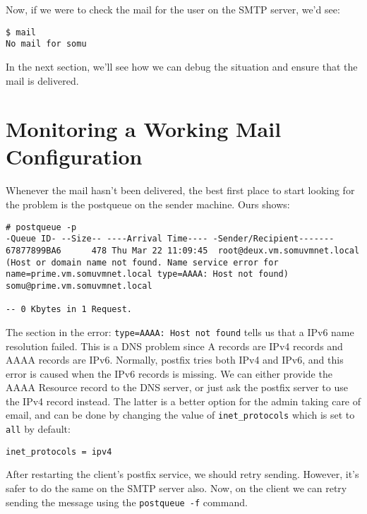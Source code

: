 \noindent
Now, if we were to check the mail for the user on the SMTP server, we'd see:

\vspace{-15pt}
\begin{verbatim}
$ mail
No mail for somu
\end{verbatim}
\vspace{-10pt}	

In the next section, we'll see how we can debug the situation and ensure that the mail is delivered. 

	\section{Monitoring a Working Mail Configuration}
Whenever the mail hasn't been delivered, the best first place to start looking for the problem is the postqueue on the sender machine. Ours shows:

\vspace{-15pt}
\begin{verbatim}
# postqueue -p
-Queue ID- --Size-- ----Arrival Time---- -Sender/Recipient-------
67877899BA6      478 Thu Mar 22 11:09:45  root@deux.vm.somuvmnet.local
(Host or domain name not found. Name service error for name=prime.vm.somuvmnet.local type=AAAA: Host not found)
somu@prime.vm.somuvmnet.local

-- 0 Kbytes in 1 Request.
\end{verbatim}
\vspace{-10pt}	

\noindent
The section in the error: \verb|type=AAAA: Host not found| tells us that a IPv6 name resolution failed. This is a DNS problem since A records are IPv4 records and AAAA records are IPv6. Normally, postfix tries both IPv4 and IPv6, and this error is caused when the IPv6 records is missing. We can either provide the AAAA Resource record to the DNS server, or just ask the postfix server to use the IPv4 record instead. The latter is a better option for the admin taking care of email, and can be done by changing the value of \verb|inet_protocols| which is set to \verb|all| by default:

\vspace{-15pt}
\begin{verbatim}
inet_protocols = ipv4
\end{verbatim}
\vspace{-10pt}	

\noindent
After restarting the client's postfix service, we should retry sending. However, it's safer to do the same on the SMTP server also. Now, on the client we can retry sending the message using the \verb|postqueue -f| command. 

